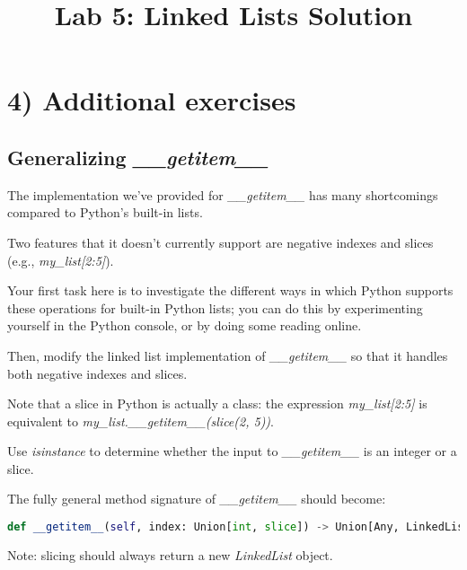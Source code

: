 \documentclass[12pt]{article}
\begin{document}
\title{Lab 5: Linked Lists Solution}
\date{}
\maketitle

\section*{4) Additional exercises}
\subsection*{Generalizing \textit{\_\_getitem\_\_}}
The implementation we’ve provided for \textit{\_\_getitem\_\_} has many shortcomings
compared to Python’s built-in lists.

\bigskip

\noindent Two features that it doesn’t currently support are negative indexes and slices
(e.g., \textit{my\_list[2:5]}).

\bigskip

\noindent Your first task here is to investigate the different ways in which Python
supports these operations for built-in Python lists; you can do this by experimenting
yourself in the Python console, or by doing some reading online.

\bigskip

\noindent Then, modify the linked list implementation of \textit{\_\_getitem\_\_}
so that it handles both negative indexes and slices.

\bigskip

\noindent Note that a slice in Python is actually a class: the expression
\textit{my\_list[2:5]} is equivalent to \textit{my\_list.\_\_getitem\_\_(slice(2, 5))}.

\bigskip

\noindent Use \textit{isinstance} to determine whether the input to \textit{\_\_getitem\_\_}
is an integer or a slice.

\bigskip

\noindent The fully general method signature of \textit{\_\_getitem\_\_} should
become:

\bigskip

\begin{lstlisting}[language=python]
    def __getitem__(self, index: Union[int, slice]) -> Union[Any, LinkedList]
\end{lstlisting}

\bigskip

\noindent Note: slicing should always return a new \textit{LinkedList} object.
\end{document}
